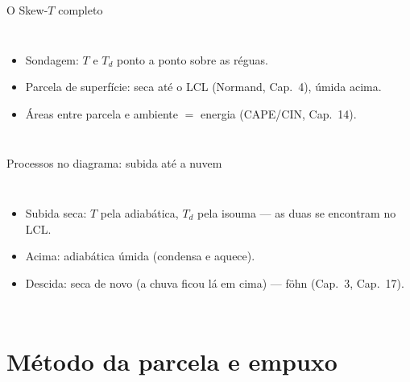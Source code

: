 \documentclass[aspectratio=169,11pt]{beamer}
\begin{document}
\begin{frame}{O Skew-$T$ completo}
  \begin{columns}
    \begin{itemize}
      \item Sondagem: $T$ e $T_d$ ponto a ponto \alert{sobre} as réguas.
      \item Parcela de superfície: seca até o LCL (Normand, Cap.~4),
            úmida acima.
      \item Áreas entre parcela e ambiente $=$ energia (CAPE/CIN,
            Cap.~14).
    \end{itemize}
  \end{columns}
\end{frame}

\begin{frame}{Processos no diagrama: subida até a nuvem}
  \begin{columns}
    \begin{itemize}
      \item Subida seca: $T$ pela adiabática, $T_d$ pela isouma — as
            duas se encontram no \alert{LCL}.
      \item Acima: adiabática úmida (condensa e aquece).
      \item Descida: seca de novo (a chuva ficou lá em cima) — föhn
            (Cap.~3, Cap.~17).
    \end{itemize}
  \end{columns}
\end{frame}

\section{Método da parcela e empuxo}
\end{document}
